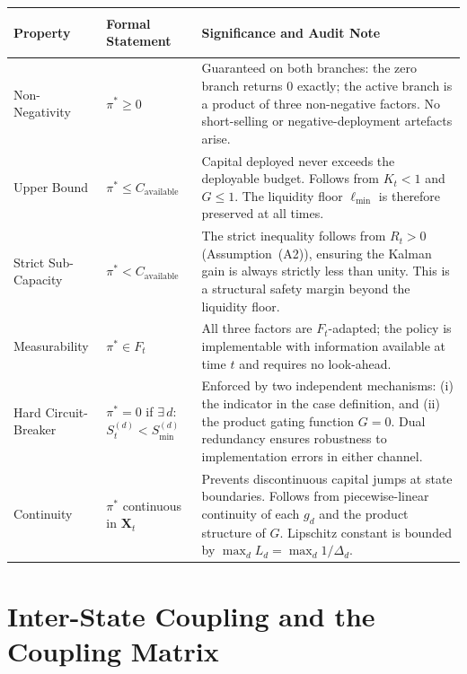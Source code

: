 \documentclass[12pt,openany]{book}
\newcommand{\calF}{\mathcal{F}}
\numberwithin{equation}{chapter}
\theoremstyle{plain}
\theoremstyle{definition}
\theoremstyle{remark}
\def\mathcal#1{#1}%
\begin{document}
\begin{center}
\begin{tabularx}{\linewidth}{
  >{\bfseries\raggedright\arraybackslash}p{3.2cm}
  >{\centering\arraybackslash}p{3.4cm}
  >{\raggedright\arraybackslash}X}
\toprule
Property &
Formal Statement &
Significance and Audit Note \\
\midrule
Non-Negativity &
$\pi^* \geq 0$ &
Guaranteed on both branches: the zero branch returns $0$
exactly; the active branch is a product of three
non-negative factors.  No short-selling or
negative-deployment artefacts arise. \\[4pt]
Upper Bound &
$\pi^* \leq C_{\mathrm{available}}$ &
Capital deployed never exceeds the deployable budget.
Follows from $K_t < 1$ and $G \leq 1$.  The liquidity
floor $\ell_{\min}$ is therefore preserved at all times. \\[4pt]
Strict Sub-Capacity &
$\pi^* < C_{\mathrm{available}}$ &
The strict inequality follows from $R_t > 0$
(Assumption~(A2)), ensuring the Kalman gain is always
strictly less than unity.  This is a structural safety
margin beyond the liquidity floor. \\[4pt]
Measurability &
$\pi^* \in \calF_t$ &
All three factors are $\calF_t$-adapted; the policy
is implementable with information available at time $t$
and requires no look-ahead. \\[4pt]
Hard Circuit-Breaker &
$\pi^* = 0$ if $\exists\, d:$
$\mathcal{S}_t^{(d)} < \mathcal{S}_{\min}^{(d)}$ &
Enforced by two independent mechanisms: (i) the
indicator in the case definition, and (ii) the
product gating function $G = 0$.  Dual redundancy
ensures robustness to implementation errors in
either channel. \\[4pt]
Continuity &
$\pi^*$ continuous in $\mathbf{X}_t$ &
Prevents discontinuous capital jumps at state
boundaries.  Follows from piecewise-linear continuity
of each $g_d$ and the product structure of $G$.
Lipschitz constant is bounded by
$\max_d L_d = \max_d 1/\Delta_d$. \\
\bottomrule
\end{tabularx}
\end{center}

\chapter{Inter-State Coupling and the Coupling Matrix}
\label{ch:coupling}
\end{document}
